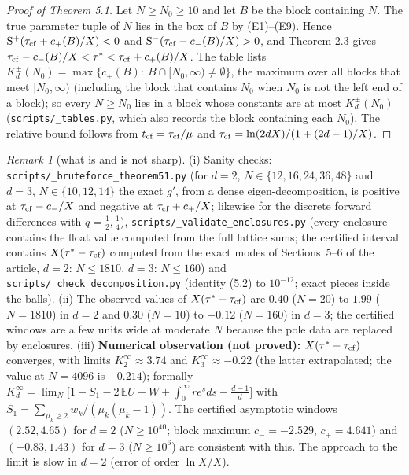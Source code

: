 \documentclass[11pt,a4paper]{article}
\theoremstyle{definition}
\theoremstyle{remark}
\newtheorem{remark}[theorem]{Remark}
\begin{document}
\begin{proof}[{Proof of Theorem 5.1}]
Let $N\ge N_0\ge10$ and let $B$ be the block containing $N$. The true parameter tuple of $N$ lies in the box of $B$ by (E1)–(E9). Hence ${\rm S}^+(\tau_{\rm cf}+c_+(B)/X)<0$ and ${\rm S}^-(\tau_{\rm cf}-c_-(B)/X)>0$, and Theorem 2.3 gives $\tau_{\rm cf}-c_-(B)/X<\tau^*<\tau_{\rm cf}+c_+(B)/X$. The table lists $K^\pm_d(N_0)=\max\{c_\pm(B):\ B\cap[N_0,\infty)\ne\emptyset\}$, the maximum over all blocks that meet $[N_0,\infty)$ (including the block that contains $N_0$ when $N_0$ is not the left end of a block); so every $N\ge N_0$ lies in a block whose constants are at most $K^\pm_d(N_0)$ (\texttt{scripts/\_\allowbreak tables.py}, which also records the block containing each $N_0$). The relative bound follows from $t_{\rm cf}=\tau_{\rm cf}/\mu$ and $\tau_{\rm cf}=\ln(2dX)/(1+(2d-1)/X)$.
\end{proof}

\begin{remark}[{what is and is not sharp}]
(i) Sanity checks: \texttt{scripts/\_\allowbreak bruteforce\_\allowbreak theorem51.py} (for $d=2$, $N\in\{12,16,24,36,48\}$ and $d=3$, $N\in\{10,12,14\}$ the exact $g'$, from a dense eigen-decomposition, is positive at $\tau_{\rm cf}-c_-/X$ and negative at $\tau_{\rm cf}+c_+/X$; likewise for the discrete forward differences with $q=\frac12,\frac14$), \texttt{scripts/\_\allowbreak validate\_\allowbreak enclosures.py} (every enclosure contains the float value computed from the full lattice sums; the certified interval contains $X(\tau^*-\tau_{\rm cf})$ computed from the exact modes of Sections~5--6 of the article, $d=2$: $N\le1810$, $d=3$: $N\le160$) and \texttt{scripts/\_\allowbreak check\_\allowbreak decomposition.py} (identity (5.2) to $10^{-12}$; exact pieces inside the balls). (ii) The observed values of $X(\tau^*-\tau_{\rm cf})$ are $0.40$ ($N=20$) to $1.99$ ($N=1810$) in $d=2$ and $0.30$ ($N=10$) to $-0.12$ ($N=160$) in $d=3$; the certified windows are a few units wide at moderate $N$ because the pole data are replaced by enclosures. (iii) \textbf{Numerical observation (not proved):} $X(\tau^*-\tau_{\rm cf})$ converges, with limits $K_2^\infty\approx3.74$ and $K_3^\infty\approx-0.22$ (the latter extrapolated; the value at $N=4096$ is $-0.214$); formally $K_d^\infty=\lim_N\bigl[1-S_1-2\,\mathbb EU+W+\int_0^\infty r e^{s}ds-\frac{d-1}{d}\bigr]$ with $S_1=\sum_{\mu_k\ge2}w_k/(\mu_k(\mu_k-1))$. The certified asymptotic windows $(2.52,4.65)$ for $d=2$ ($N\ge10^{40}$; block maximum $c_-=-2.529$, $c_+=4.641$) and $(-0.83,1.43)$ for $d=3$ ($N\ge10^6$) are consistent with this. The approach to the limit is slow in $d=2$ (error of order $\ln X/X$).
\end{remark}
\end{document}
